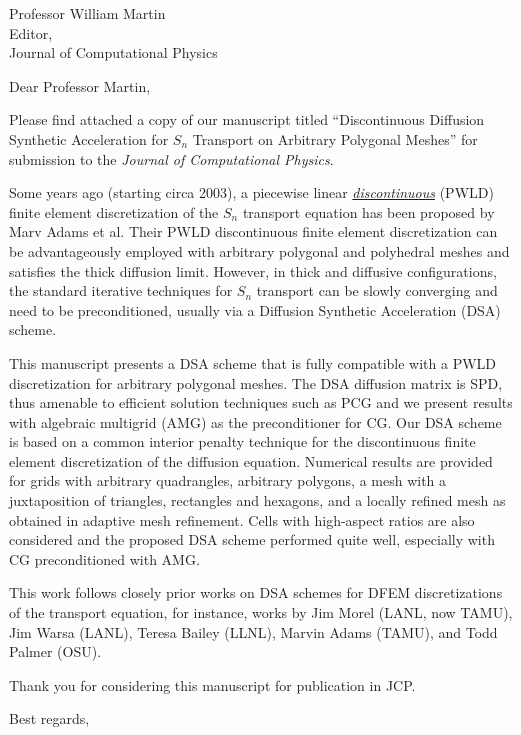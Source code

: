 \begin{letter}{Professor William Martin\\
    Editor,\\
    Journal of Computational Physics}
\date{\today}

\opening{Dear Professor Martin,}
         \vspace{0.25cm}

Please find attached a copy of our manuscript titled ``Discontinuous Diffusion Synthetic Acceleration for $S_n$ Transport on
Arbitrary Polygonal Meshes'' for submission to the {\em Journal of Computational Physics}. 

Some years ago (starting circa 2003), a piecewise linear \underline{\it discontinuous}  (PWLD) finite element discretization of the $S_n$ transport equation has been proposed by Marv Adams et al. Their PWLD discontinuous finite element discretization can be advantageously employed with arbitrary polygonal and polyhedral meshes and satisfies the thick diffusion limit. However, in thick and diffusive configurations, the standard iterative techniques for $S_n$ transport can be slowly converging and need to be preconditioned, usually via a Diffusion Synthetic Acceleration (DSA) scheme.

This manuscript presents a DSA scheme that is fully compatible with a PWLD discretization for arbitrary polygonal meshes. The DSA diffusion matrix is SPD, thus amenable to efficient solution techniques such as PCG and we present results with algebraic multigrid (AMG) as the preconditioner for CG. Our DSA scheme is based on a common interior penalty technique for the discontinuous finite element discretization of the diffusion equation.  Numerical results are provided for grids with arbitrary quadrangles, arbitrary polygons, a mesh with a juxtaposition of triangles, rectangles and hexagons, and a locally refined mesh as obtained in adaptive mesh refinement. Cells with high-aspect ratios are also considered and the proposed DSA scheme performed quite well, especially with CG preconditioned with AMG.
 
This work follows closely prior works on DSA schemes for DFEM discretizations of the transport equation, for instance, works by Jim Morel (LANL, now TAMU), Jim Warsa (LANL), Teresa Bailey (LLNL), Marvin Adams (TAMU), and Todd Palmer (OSU).



Thank you for considering this manuscript for publication in JCP.




\closing{Best regards, }

\end{letter}


